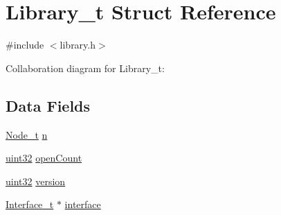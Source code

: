 \hypertarget{structLibrary__t}{\section{Library\+\_\+t Struct Reference}
\label{structLibrary__t}
}


{\ttfamily \#include $<$library.\+h$>$}



Collaboration diagram for Library\+\_\+t\+:
\subsection*{Data Fields}
\begin{DoxyCompactItemize}
\item 
\hyperlink{structNode__t}{Node\+\_\+t} \hyperlink{structLibrary__t_afa620b3754d0d0563c2e4c6de5366d27}{n}
\item 
\hyperlink{type_8h_acbd4acd0d29e2d6c43104827f77d9cd2}{uint32} \hyperlink{structLibrary__t_a714bcc96d390e14c5657d686f1a2a7c5}{open\+Count}
\item 
\hyperlink{type_8h_acbd4acd0d29e2d6c43104827f77d9cd2}{uint32} \hyperlink{structLibrary__t_a3ea09c5d30d2c42f0a2d6c31d486df86}{version}
\item 
\hyperlink{structInterface__t}{Interface\+\_\+t} $\ast$ \hyperlink{structLibrary__t_ad3b1242015e72d6afa2d2e7ad5ca8c36}{interface}
\end{DoxyCompactItemize}


